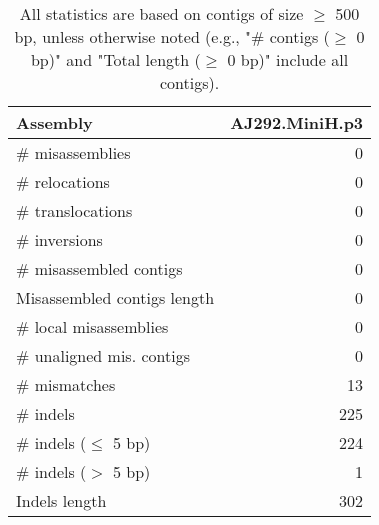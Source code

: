 \documentclass[12pt,a4paper]{article}
\begin{document}
\begin{table}[ht]
\begin{center}
\caption{All statistics are based on contigs of size $\geq$ 500 bp, unless otherwise noted (e.g., "\# contigs ($\geq$ 0 bp)" and "Total length ($\geq$ 0 bp)" include all contigs).}
\begin{tabular}{|l*{1}{|r}|}
\hline
Assembly & AJ292.MiniH.p3 \\ \hline
\# misassemblies & 0 \\ \hline
\hspace{5mm}\# relocations & 0 \\ \hline
\hspace{5mm}\# translocations & 0 \\ \hline
\hspace{5mm}\# inversions & 0 \\ \hline
\# misassembled contigs & 0 \\ \hline
Misassembled contigs length & 0 \\ \hline
\# local misassemblies & 0 \\ \hline
\# unaligned mis. contigs & 0 \\ \hline
\# mismatches & 13 \\ \hline
\# indels & 225 \\ \hline
\hspace{5mm}\# indels ($\leq$ 5 bp) & 224 \\ \hline
\hspace{5mm}\# indels ($>$ 5 bp) & 1 \\ \hline
Indels length & 302 \\ \hline
\end{tabular}
\end{center}
\end{table}
\end{document}
